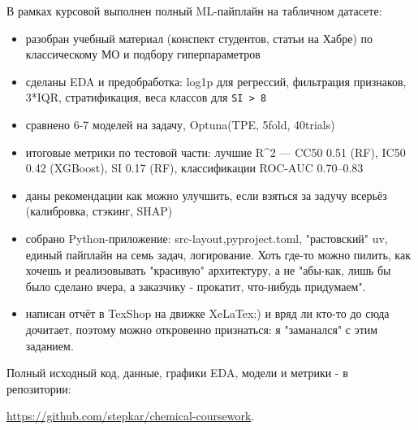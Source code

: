 \documentclass[12pt,a4paper]{report}
\begin{document}
В рамках курсовой выполнен полный ML-пайплайн на табличном датасете:

\begin{itemize}
    \item разобран учебный материал (конспект студентов, статьи на Хабре) по классическому МО и подбору гиперпараметров
    \item сделаны EDA и предобработка: log1p для регрессий, фильтрация признаков, 3*IQR, стратификация, веса классов для \texttt{SI > 8}
    \item сравнено 6-7 моделей на задачу, Optuna(TPE, 5fold, 40trials)
    \item итоговые метрики по тестовой части: лучшие R\^{}2 --- CC50 0.51 (RF), IC50 0.42 (XGBoost), SI 0.17 (RF), классификации ROC-AUC 0.70--0.83
    \item даны рекомендации как можно улучшить, если взяться за задучу всерьёз (калибровка, стэкинг, SHAP)
    \item собрано Python-приложение: src-layout,pyproject.toml, "растовский" uv, единый пайплайн на семь задач, логирование. Хоть где-то можно пилить, как хочешь и реализовывать "красивую" архитектуру, а не "абы-как, лишь бы было сделано вчера, а заказчику - прокатит, что-нибудь придумаем".
    \item написан отчёт в TexShop на движке XeLaTex:) и вряд ли кто-то до сюда дочитает, поэтому можно откровенно признаться: я "заманался" с этим заданием.
\end{itemize}

Полный исходный код, данные, графики EDA, модели и метрики - в репозитории: 

\url{https://github.com/stepkar/chemical-coursework}.
\end{document}
